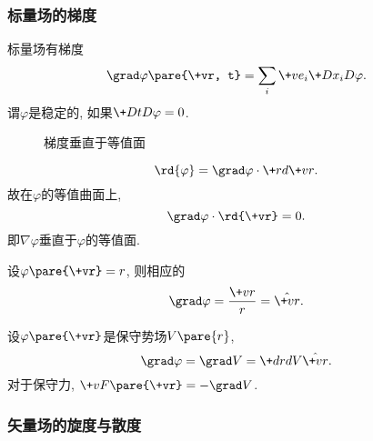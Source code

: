 \documentclass{ctexart}
\begin{document}
\subsubsection{标量场的梯度} %
\label{ssub:标量场的梯度}

标量场有梯度
\[ \grad\varphi\pare{\+vr, t} = \sum_i \+ve_i \+D{x_i}D{\varphi}. \]
谓$\varphi$是稳定的, 如果$\displaystyle \+D{t}D{\varphi} = 0$.
\begin{figure}[ht]
    \centering
    \caption{梯度垂直于等值面}
\end{figure}
\[ \rd{\varphi} = \grad\varphi \cdot\+rd{\+vr}. \]
故在$\varphi$的等值曲面上,
\[ \grad\varphi \cdot \rd{\+vr} = 0. \]
即$\nabla\varphi$垂直于$\varphi$的等值面.
\begin{sample}
    \begin{ex}
        设$\varphi\pare{\+vr} = r$, 则相应的
        \[ \grad\varphi = \frac{\+vr}{r} = \hat{\+vr}. \]
    \end{ex}
    \begin{ex}
        设$\varphi\pare{\+vr}$是保守势场$V\pare{r}$,
        \[ \grad\varphi = \grad V  = \+drdV \hat{\+vr}. \]
        对于保守力, $\+vF\pare{\+vr} = -\grad V$.
    \end{ex}
\end{sample}


\subsubsection{矢量场的旋度与散度} %
\label{ssub:矢量场的旋度与散度}
\end{document}

